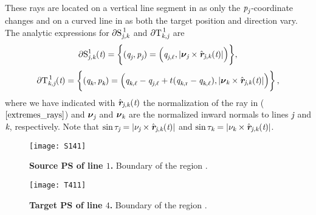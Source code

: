  These rays are located on a vertical line segment in  as only the $\mbox{\textit{p}}_{\textit{\textit{j}}}$-coordinate changes and on a curved line in 
  as both the target position and direction vary. The analytic expressions for $\partial \mbox{$\textup{S}_{\textit{\textit{j},\textit{k}}}^{\,1}$}$ and $\partial \mbox{$\textup{T}_{\textit{\textit{k},\textit{j}}}^{\,1}$}$ are
\begin{equation}
\label{S_boundary}
\partial \mbox{$\textup{S}_{\textit{\textit{j},\textit{k}}}^{1}$}(\textit{t})= \bigg\{ (\textit{q}_{\textit{\textit{j}}}, \textit{p}_{\textit{\textit{j}}}) = \Big(\textit{q}_{\textit{\textit{j}}, \ell},
|\boldsymbol{\nu}_{\textit{\textit{j}}}\times \hat{\textit{\textbf{r}}}_{\textit{\textit{j}}, \textit{\textit{k}}}(\textit{t})|
\Big) \bigg\},
\end{equation}
\begin{equation}
\label{T_boundary}
\partial\mbox{$\textup{T}_{\textit{\textit{k},\textit{j}}}^{\,1}$}(\textit{t})=\bigg\{(\textit{q}_{\textit{\textit{k}}}, \textit{p}_{\textit{\textit{k}}}) =
\Big(\textit{q}_{\textit{\textit{k}}, \ell}-\textit{q}_{\textit{\textit{j}}, \ell}+t(\textit{q}_{\textit{\textit{k}}, \textrm{r}}-\textit{q}_{\textit{\textit{k}},\ell}),
|\boldsymbol{\nu}_{\textit{\textit{k}}}\times \hat{\textit{\textbf{r}}}_{\textit{\textit{j}}, \textit{\textit{k}}}(\textit{t})|\Big) \bigg\}\,,
\end{equation}
where we have indicated with $\hat{\textit{\textbf{r}}}_{\textit{\textit{j}}, \textit{\textit{k}}}(\textit{t})$ the normalization of the ray in ($\ref{extremes_rays}$) and
 $ \boldsymbol{\nu}_{\textit{\textit{j}}}$ and $\boldsymbol{\nu}_{\textit{\textit{k}}}$ are the normalized inward normals to lines $\textit{\textit{j}}$ and $\textit{\textit{k}}$, respectively.
 Note that  $\sin{\tau_{\textit{\textit{j}}}} = |\nu_{\textit{\textit{j}}}\times \hat{\textit{\textbf{r}}}_{\textit{\textit{j}}, \textit{\textit{k}}}(\textit{t})|$ and $\sin{\tau_{\textit{\textit{k}}}} = |\nu_{\textit{\textit{k}}}\times \hat{\textit{\textbf{r}}}_{\textit{\textit{j}}, \textit{\textit{k}}}(\textit{t})|$.
 \begin{figure}
 \begin{minipage}[]{.48\textwidth}
   \centering
   \texttt{[image: S141]}
   \caption{\textbf{Source PS of line $1$.}
   Boundary of the region .}
   \label{fig:S14}
 \end{minipage}\hfill
  \begin{minipage}[]{0.48\textwidth}
  \centering
   \texttt{[image: T411]}
   \caption{\textbf{Target PS of line $4$.}
    Boundary of the region .}
    \label{fig:T411}
 \end{minipage}
 \end{figure}
